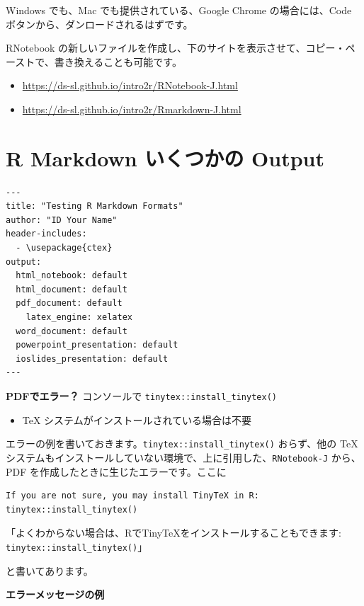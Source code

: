 \documentclass[
  xelatex, ja=standard]{bxjsbook}
\providecommand{\tightlist}{%
  \setlength{\itemsep}{0pt}\setlength{\parskip}{0pt}}
\theoremstyle{definition}
\theoremstyle{definition}
\theoremstyle{definition}
\theoremstyle{definition}
\theoremstyle{remark}
\begin{document}
Windows でも、Mac でも提供されている、Google Chrome の場合には、Code ボタンから、ダンロードされるはずです。

RNotebook の新しいファイルを作成し、下のサイトを表示させて、コピー・ペーストで、書き換えることも可能です。

\begin{itemize}
\tightlist
\item
  \url{https://ds-sl.github.io/intro2r/RNotebook-J.html}
\item
  \url{https://ds-sl.github.io/intro2r/Rmarkdown-J.html}
\end{itemize}

\hypertarget{r-markdown-ux3044ux304fux3064ux304bux306e-output}{%
\section{R Markdown いくつかの Output}\label{r-markdown-ux3044ux304fux3064ux304bux306e-output}}

\begin{verbatim}
---
title: "Testing R Markdown Formats"
author: "ID Your Name"
header-includes:
  - \usepackage{ctex}
output:
  html_notebook: default
  html_document: default
  pdf_document: default
    latex_engine: xelatex
  word_document: default
  powerpoint_presentation: default
  ioslides_presentation: default
---
\end{verbatim}

\textbf{PDFでエラー？} コンソールで \texttt{tinytex::install\_tinytex()}

\begin{itemize}
\tightlist
\item
  TeX システムがインストールされている場合は不要
\end{itemize}

エラーの例を書いておきます。\texttt{tinytex::install\_tinytex()} おらず、他の TeX システムもインストールしていない環境で、上に引用した、\texttt{RNotebook-J} から、PDF を作成したときに生じたエラーです。ここに

\begin{verbatim}
If you are not sure, you may install TinyTeX in R: tinytex::install_tinytex()
\end{verbatim}

「よくわからない場合は、RでTinyTeXをインストールすることもできます: \texttt{tinytex::install\_tinytex()}」

と書いてあります。

\textbf{エラーメッセージの例}
\end{document}
